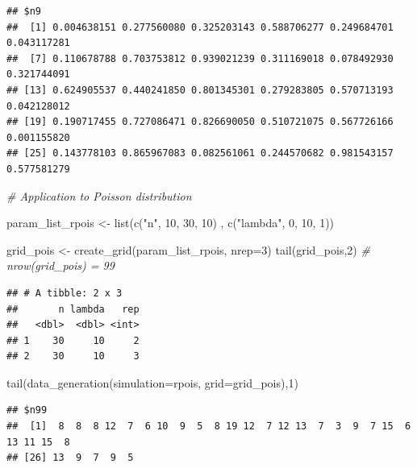 \documentclass[11pt,a4paper]{article}
\newenvironment{Shaded}{\begin{snugshade}}{\end{snugshade}}
\newcommand{\AttributeTok}[1]{\textcolor[rgb]{0.77,0.63,0.00}{#1}}
\newcommand{\CommentTok}[1]{\textcolor[rgb]{0.56,0.35,0.01}{\textit{#1}}}
\newcommand{\DecValTok}[1]{\textcolor[rgb]{0.00,0.00,0.81}{#1}}
\newcommand{\FunctionTok}[1]{\textcolor[rgb]{0.00,0.00,0.00}{#1}}
\newcommand{\NormalTok}[1]{#1}
\newcommand{\OtherTok}[1]{\textcolor[rgb]{0.56,0.35,0.01}{#1}}
\newcommand{\StringTok}[1]{\textcolor[rgb]{0.31,0.60,0.02}{#1}}
\begin{document}
\begin{verbatim}
## $n9
##  [1] 0.004638151 0.277560080 0.325203143 0.588706277 0.249684701 0.043117281
##  [7] 0.110678788 0.703753812 0.939021239 0.311169018 0.078492930 0.321744091
## [13] 0.624905537 0.440241850 0.801345301 0.279283805 0.570713193 0.042128012
## [19] 0.190717455 0.727086471 0.826690050 0.510721075 0.567726166 0.001155820
## [25] 0.143778103 0.865967083 0.082561061 0.244570682 0.981543157 0.577581279
\end{verbatim}

\begin{Shaded}
\begin{Highlighting}[]
\CommentTok{\# Application to Poisson distribution}

\NormalTok{param\_list\_rpois }\OtherTok{\textless{}{-}} \FunctionTok{list}\NormalTok{(}\FunctionTok{c}\NormalTok{(}\StringTok{"n"}\NormalTok{, }\DecValTok{10}\NormalTok{, }\DecValTok{30}\NormalTok{, }\DecValTok{10}\NormalTok{)}
\NormalTok{                         , }\FunctionTok{c}\NormalTok{(}\StringTok{"lambda"}\NormalTok{, }\DecValTok{0}\NormalTok{, }\DecValTok{10}\NormalTok{, }\DecValTok{1}\NormalTok{))}

\NormalTok{grid\_pois }\OtherTok{\textless{}{-}} \FunctionTok{create\_grid}\NormalTok{(param\_list\_rpois, }\AttributeTok{nrep=}\DecValTok{3}\NormalTok{)}
\FunctionTok{tail}\NormalTok{(grid\_pois,}\DecValTok{2}\NormalTok{) }\CommentTok{\# nrow(grid\_pois) = 99}
\end{Highlighting}
\end{Shaded}

\begin{verbatim}
## # A tibble: 2 x 3
##       n lambda   rep
##   <dbl>  <dbl> <int>
## 1    30     10     2
## 2    30     10     3
\end{verbatim}

\begin{Shaded}
\begin{Highlighting}[]
\FunctionTok{tail}\NormalTok{(}\FunctionTok{data\_generation}\NormalTok{(}\AttributeTok{simulation=}\NormalTok{rpois, }\AttributeTok{grid=}\NormalTok{grid\_pois),}\DecValTok{1}\NormalTok{)}
\end{Highlighting}
\end{Shaded}

\begin{verbatim}
## $n99
##  [1]  8  8  8 12  7  6 10  9  5  8 19 12  7 12 13  7  3  9  7 15  6 13 11 15  8
## [26] 13  9  7  9  5
\end{verbatim}
\end{document}
